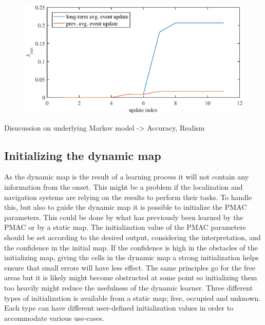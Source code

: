 \begin{figure}[htbp]
    \centering
    \includegraphics[scale=1]{chapters/mapping_of_dynamic_areas/figures/visualization_of_advantage_long_term_average}
    \caption{}
    \label{fig:visualization_of_advantage_long_term_average}
\end{figure}




Disucussion on underlying Markov model -> Accuracy, Realism

\subsection{Initializing the dynamic map}
As the dynamic map is the result of a learning process it will not contain any information from the onset. 
This might be a problem if the localization and navigation systems are relying on the results to perform their tasks.
To handle this, but also to guide the dynamic map it is possible to initialize the PMAC parameters. 
This could be done by what has previously been learned by the PMAC or by a static map.
The initialization value of the PMAC parameters should be set according to the desired output, considering the interpretation, and  the confidence in the initial map.
If the confidence is high in the obstacles of the initializing map, giving the cells in the dynamic map a strong initialization helps ensure that small errors will have less effect. 
The same principles go for the free areas but it is likely might become obstructed at some point so initializing them too heavily might reduce the usefulness of the dynamic learner.
Three different types of initialization is available from a static map; free, occupied and unknown.
Each type can have different user-defined initialization values in order to accommodate various use-cases.  
